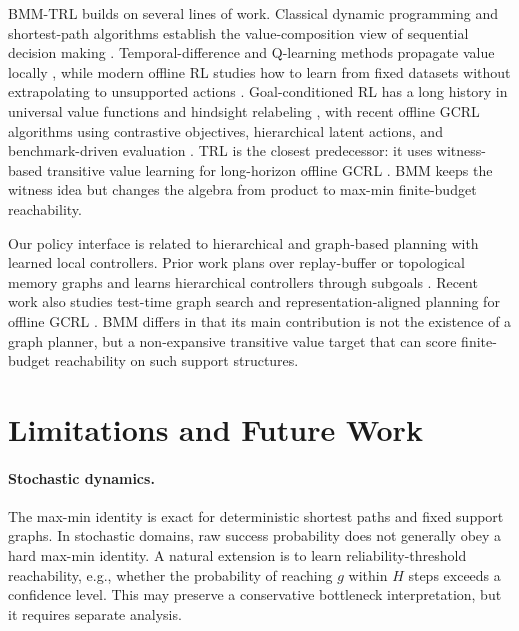 \documentclass[11pt]{article}
\begin{document}
BMM-TRL builds on several lines of work. Classical dynamic programming and
shortest-path algorithms establish the value-composition view of sequential
decision making \citep{bellman1957dynamic,bertsekas2017dp}. Temporal-difference
and Q-learning methods propagate value locally \citep{sutton1988td,watkins1992qlearning},
while modern offline RL studies how to learn from fixed datasets without
extrapolating to unsupported actions \citep{fujimoto2019bcq,kumar2019bear,kumar2020cql,fujimoto2021td3bc,kostrikov2022iql}.
Goal-conditioned RL has a long history in universal value functions and
hindsight relabeling \citep{kaelbling1993learning,schaul2015uvfa,andrychowicz2017her},
with recent offline GCRL algorithms using contrastive objectives, hierarchical
latent actions, and benchmark-driven evaluation
\citep{eysenbach2022contrastive,park2023hiql,park2024ogbench,zhu2023provably}.
TRL is the closest predecessor: it uses witness-based transitive value learning
for long-horizon offline GCRL \citep{park2025trl}. BMM keeps the witness idea but
changes the algebra from product to max-min finite-budget reachability.

Our policy interface is related to hierarchical and graph-based planning with
learned local controllers. Prior work plans over replay-buffer or topological
memory graphs \citep{savinov2018sptm,eysenbach2019sorb} and learns hierarchical
controllers through subgoals \citep{nachum2018hiro,levy2019learning,nair2018rig}.
Recent work also studies test-time graph search and representation-aligned
planning for offline GCRL \citep{opryshko2025ttgs,kang2026lavl}. BMM differs in
that its main contribution is not the existence of a graph planner, but a
non-expansive transitive value target that can score finite-budget reachability
on such support structures.

\section{Limitations and Future Work}
\label{sec:limitations}

\paragraph{Stochastic dynamics.}
The max-min identity is exact for deterministic shortest paths and fixed support
graphs. In stochastic domains, raw success probability does not generally obey a
hard max-min identity. A natural extension is to learn reliability-threshold
reachability, e.g., whether the probability of reaching $g$ within $H$ steps
exceeds a confidence level. This may preserve a conservative bottleneck
interpretation, but it requires separate analysis.
\end{document}
